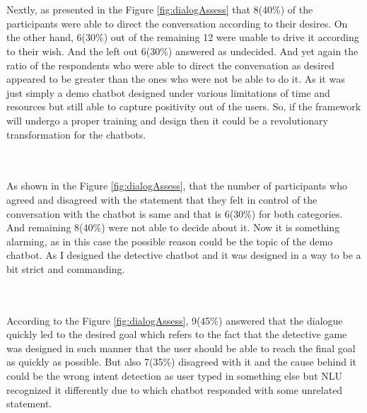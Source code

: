 \\~\\
Nextly, as presented in the Figure \ref{fig:dialogAssess} that 8(40\%) of the participants were able to direct the conversation according to their desires. On the other hand, 6(30\%) out of the remaining 12 were unable to drive it according to their wish. And the left out 6(30\%) answered as undecided. And yet again the ratio of the respondents who were able to direct the conversation as desired appeared to be greater than the ones who were not be able to do it. As it was just simply a demo chatbot designed under various limitations of time and resources but still able to capture positivity out of the users. So, if the framework will undergo a proper training and design then it could be a revolutionary transformation for the chatbots.

\\~\\
As shown in the Figure \ref{fig:dialogAssess}, that the number of participants who agreed and disagreed with the statement that they felt in control of the conversation with the chatbot is same and that is 6(30\%) for both categories. And remaining 8(40\%) were not able to decide about it. Now it is something alarming, as in this case the possible reason could be the topic of the demo chatbot. As I designed the detective chatbot and it was designed in a way to be a bit strict and commanding. 

\\~\\
According to the Figure \ref{fig:dialogAssess}, 9(45\%) answered that the dialogue quickly led to the desired goal which refers to the fact that the detective game was designed in such manner that the user should be able to reach the final goal as quickly as possible. But also 7(35\%) disagreed with it and the cause behind it could be the wrong intent detection as user typed in something else but NLU recognized it differently due to which chatbot responded with some unrelated statement.

